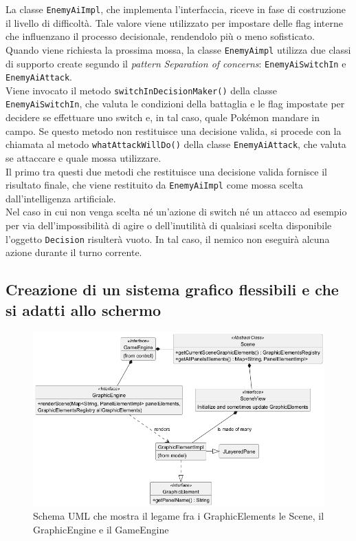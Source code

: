 \documentclass[a4paper,12pt]{report}
\begin{document}
{{La classe \texttt{EnemyAiImpl}, che implementa l'interfaccia, riceve in fase di costruzione il livello di difficoltà. Tale valore viene utilizzato per impostare delle flag interne che influenzano il processo decisionale, rendendolo più o meno sofisticato.\\Quando viene richiesta la prossima mossa, la classe \texttt{EnemyAimpl} utilizza due classi di supporto create segundo il \textit{pattern} \textit{Separation of concerns}: \texttt{EnemyAiSwitchIn} e \texttt{EnemyAiAttack}.\\
Viene invocato il metodo \texttt{switchInDecisionMaker()} della classe \texttt{EnemyAiSwitchIn}, che valuta le condizioni della battaglia e le flag impostate per decidere se effettuare uno switch e, in tal caso, quale Pokémon mandare in campo. Se questo metodo non restituisce una decisione valida, si procede con la chiamata al metodo \texttt{whatAttackWillDo()} della classe \texttt{EnemyAiAttack}, che valuta se attaccare e quale mossa utilizzare.\\
Il primo tra questi due metodi che restituisce una decisione valida fornisce il risultato finale, che viene restituito da \texttt{EnemyAiImpl} come mossa scelta dall'intelligenza artificiale.\\
Nel caso in cui non venga scelta né un'azione di switch né un attacco ad esempio per via dell'impossibilità di agire o dell'inutilità di qualsiasi scelta disponibile l'oggetto \texttt{Decision} risulterà vuoto. In tal caso, il nemico non eseguirà alcuna azione durante il turno corrente.\\
\subsection*{Creazione di un sistema grafico flessibili e che si adatti allo schermo}


\begin{figure}[H]
\centering{}
\includegraphics[width=\textwidth]{immagini/GraphicsUml.png}
\caption{Schema UML che mostra il legame fra i GraphicElements le Scene, il GraphicEngine e il GameEngine }
\label{immagini/GraphicsUml.png}
\end{figure}

}}
\end{document}
